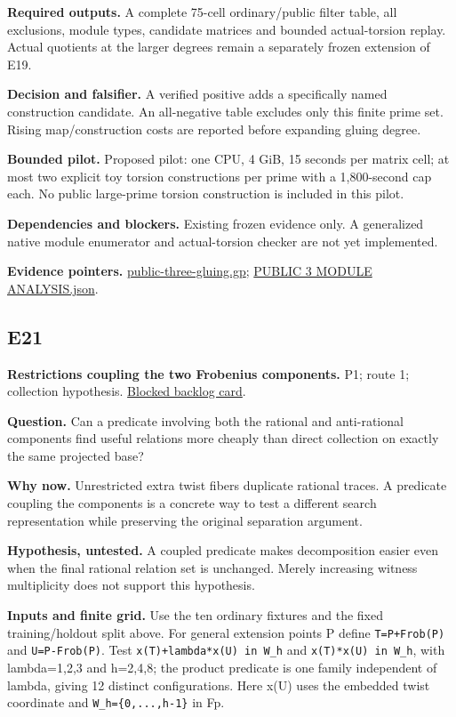 \documentclass[
  10pt,
]{article}
\begin{document}
\textbf{Required outputs.} A complete 75-cell ordinary/public filter
table, all exclusions, module types, candidate matrices and bounded
actual-torsion replay. Actual quotients at the larger degrees remain a
separately frozen extension of E19.

\textbf{Decision and falsifier.} A verified positive adds a specifically
named construction candidate. An all-negative table excludes only this
finite prime set. Rising map/construction costs are reported before
expanding gluing degree.

\textbf{Bounded pilot.} Proposed pilot: one CPU, 4 GiB, 15 seconds per
matrix cell; at most two explicit toy torsion constructions per prime
with a 1,800-second cap each. No public large-prime torsion construction
is included in this pilot.

\textbf{Dependencies and blockers.} Existing frozen evidence only. A
generalized native module enumerator and actual-torsion checker are not
yet implemented.

\textbf{Evidence pointers.}
\href{../../../research/twist_routes_1_3_20261021/public-three-gluing.gp}{public-three-gluing.gp};
\href{../../../research/twist_routes_1_3_20261021/reports/execution-20261022T0032Z/PUBLIC_3_MODULE_ANALYSIS.json}{PUBLIC
3 MODULE ANALYSIS.json}.

\subsection{E21}\label{e21}

\textbf{Restrictions coupling the two Frobenius components.} P1; route
1; collection hypothesis.
\href{../../../backlog/XP-20261022-twist-coupled-component-bases/README.md}{Blocked
backlog card}.

\textbf{Question.} Can a predicate involving both the rational and
anti-rational components find useful relations more cheaply than direct
collection on exactly the same projected base?

\textbf{Why now.} Unrestricted extra twist fibers duplicate rational
traces. A predicate coupling the components is a concrete way to test a
different search representation while preserving the original separation
argument.

\textbf{Hypothesis, untested.} A coupled predicate makes decomposition
easier even when the final rational relation set is unchanged. Merely
increasing witness multiplicity does not support this hypothesis.

\textbf{Inputs and finite grid.} Use the ten ordinary fixtures and the
fixed training/holdout split above. For general extension points P
define \texttt{T=P+Frob(P)} and \texttt{U=P-Frob(P)}. Test
\texttt{x(T)+lambda*x(U)\ in\ W\_h} and \texttt{x(T)*x(U)\ in\ W\_h},
with lambda=1,2,3 and h=2,4,8; the product predicate is one family
independent of lambda, giving 12 distinct configurations. Here x(U) uses
the embedded twist coordinate and \texttt{W\_h=\{0,...,h-1\}} in Fp.
\end{document}
